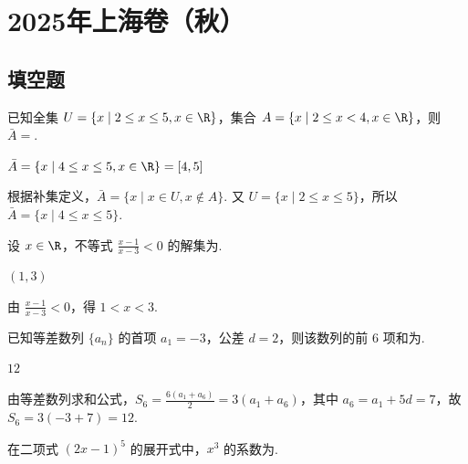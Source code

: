 \documentclass[UTF8,a4paper,oneside,11pt]{ctexbook}
\begin{document}
\mainmatter

\chapter{2025年上海卷（秋）}

\section{填空题}

\begin{problem}
已知全集 \(U = \{x \mid 2 \le x \le 5, x \in \R\}\)，集合 \(A = \{x \mid 2 \le x < 4, x \in \R\}\)，则 \(\bar{A} =\)\fillinblank{}.
\end{problem}

\begin{answer}
\(\bar{A} = \{x \mid 4 \le x \le 5, x \in \R\}=[4,5]\)
\end{answer}

\begin{solution}
根据补集定义，\(\bar{A} = \{x \mid x \in U, x \notin A\}\). 又 \(U=\{x\mid2\le x\le5\}\)，所以 \(\bar{A}=\{x\mid4\le x\le5\}\).
\end{solution}

\begin{problem}
设 \(x\in\R\)，不等式 \(\frac{x-1}{x-3}<0\) 的解集为\fillinblank{}.
\end{problem}

\begin{answer}
\((1,3)\)
\end{answer}

\begin{solution}
由 \(\frac{x-1}{x-3}<0\)，得 \(1<x<3\).
\end{solution}

\begin{problem}
已知等差数列 \(\{a_n\}\) 的首项 \(a_1 = -3\)，公差 \(d = 2\)，则该数列的前 \(6\) 项和为\fillinblank{}.
\end{problem}

\begin{answer}
\(12\)
\end{answer}

\begin{solution}
由等差数列求和公式，\(S_6 = \frac{6(a_1+a_6)}{2}=3(a_1+a_6)\)，其中 \(a_6=a_1+5d=7\)，故 \(S_6=3(-3+7)=12\).
\end{solution}

\begin{problem}
在二项式 \((2x-1)^5\) 的展开式中，\(x^3\) 的系数为\fillinblank{}.
\end{problem}
\end{document}
